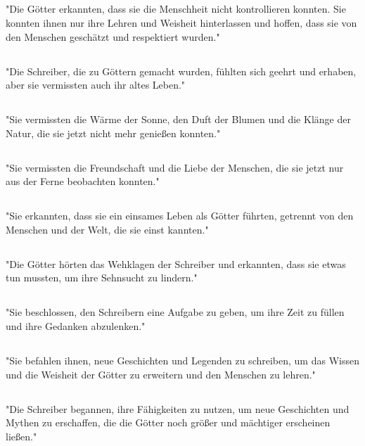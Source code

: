 \documentclass{article}
\begin{document}
\subsection{}
"Die Götter erkannten, dass sie die Menschheit nicht kontrollieren konnten. Sie konnten ihnen nur ihre Lehren und Weisheit hinterlassen und hoffen, dass sie von den Menschen geschätzt und respektiert wurden."
\subsection{}
"Die Schreiber, die zu Göttern gemacht wurden, fühlten sich geehrt und erhaben, aber sie vermissten auch ihr altes Leben."
\subsection{}
"Sie vermissten die Wärme der Sonne, den Duft der Blumen und die Klänge der Natur, die sie jetzt nicht mehr genießen konnten."
\subsection{}
"Sie vermissten die Freundschaft und die Liebe der Menschen, die sie jetzt nur aus der Ferne beobachten konnten."
\subsection{}
"Sie erkannten, dass sie ein einsames Leben als Götter führten, getrennt von den Menschen und der Welt, die sie einst kannten."
\subsection{}
"Die Götter hörten das Wehklagen der Schreiber und erkannten, dass sie etwas tun mussten, um ihre Sehnsucht zu lindern."
\subsection{}
"Sie beschlossen, den Schreibern eine Aufgabe zu geben, um ihre Zeit zu füllen und ihre Gedanken abzulenken."
\subsection{}
"Sie befahlen ihnen, neue Geschichten und Legenden zu schreiben, um das Wissen und die Weisheit der Götter zu erweitern und den Menschen zu lehren."
\subsection{}
"Die Schreiber begannen, ihre Fähigkeiten zu nutzen, um neue Geschichten und Mythen zu erschaffen, die die Götter noch größer und mächtiger erscheinen ließen."
\end{document}
